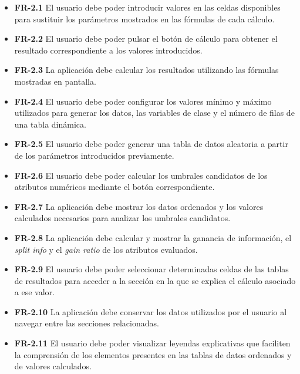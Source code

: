 \begin{itemize}
\begin{itemize}
    \item \textbf{FR-2.1} El usuario debe poder introducir valores en las celdas disponibles para sustituir los parámetros mostrados en las fórmulas de cada cálculo.

    \item \textbf{FR-2.2} El usuario debe poder pulsar el botón de cálculo para obtener el resultado correspondiente a los valores introducidos.

    \item \textbf{FR-2.3} La aplicación debe calcular los resultados utilizando las fórmulas mostradas en pantalla.

    \item \textbf{FR-2.4} El usuario debe poder configurar los valores mínimo y máximo utilizados para generar los datos, las variables de clase y el número de filas de una tabla dinámica.

    \item \textbf{FR-2.5} El usuario debe poder generar una tabla de datos aleatoria a partir de los parámetros introducidos previamente.

    \item \textbf{FR-2.6} El usuario debe poder calcular los umbrales candidatos de los atributos numéricos mediante el botón correspondiente.

    \item \textbf{FR-2.7} La aplicación debe mostrar los datos ordenados y los valores calculados necesarios para analizar los umbrales candidatos.

    \item \textbf{FR-2.8} La aplicación debe calcular y mostrar la ganancia de información, el \textit{split info} y el \textit{gain ratio}  de los atributos evaluados.

    \item \textbf{FR-2.9} El usuario debe poder seleccionar determinadas celdas de las tablas de resultados para acceder a la sección en la que se explica el cálculo asociado a ese valor.

    \item \textbf{FR-2.10} La aplicación debe conservar los datos utilizados por el usuario al navegar entre las secciones relacionadas.

    \item \textbf{FR-2.11} El usuario debe poder visualizar leyendas explicativas que faciliten la comprensión de los elementos presentes en las tablas de datos ordenados y de valores calculados.


\end{itemize}
\end{itemize}
